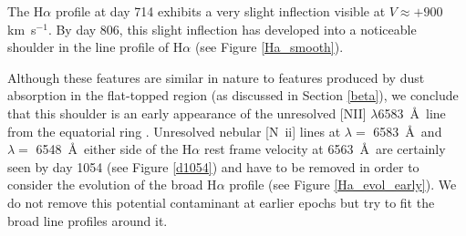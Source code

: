 \documentclass[useAMS,usenatbib,usegraphicx]{mnras}
\begin{document}

The H$\alpha$ profile at day 714 exhibits a very slight inflection visible at $V \approx +900$ km~s$^{-1}$.  By day 806, this slight inflection has developed into a noticeable shoulder in the line profile of H$\alpha$ (see Figure \ref{Ha_smooth}).

Although these features are similar in nature to features produced by dust absorption in the flat-topped region (as discussed in Section \ref{beta}), we conclude that this shoulder
is an early appearance of the unresolved [NII] $\lambda$6583~\AA\ line from the equatorial ring \citep{Kozma1998}. 
Unresolved nebular [N~{\sc ii}] lines at $\lambda=$ 
6583~\AA\ and $\lambda=$ 6548~\AA\ either side of the H$\alpha$ rest frame
 velocity at 6563~\AA\ are certainly seen by day 1054 (see Figure \ref{d1054}) and have to be 
removed in order to consider the evolution of the broad H$\alpha$ profile (see Figure \ref{Ha_evol_early}). 
We do not remove this potential contaminant at earlier epochs but try to fit the broad line profiles around it.
\end{document}
